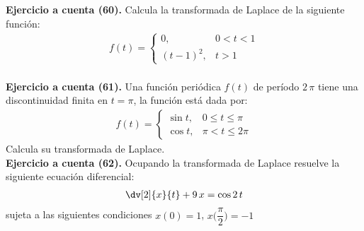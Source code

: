 \noindent
\textbf{Ejercicio a cuenta (60). } Calcula la transformada de Laplace de la siguiente función:
\begin{align*}
f(t) = \begin{cases}
0, & 0 < t < 1 \\
(t - 1)^{2}, & t > 1
\end{cases}
\end{align*}
\\[0.5em]
\noindent
\textbf{Ejercicio a cuenta (61). } Una función periódica $f(t)$ de período $2 \, \pi$ tiene una discontinuidad finita en $t = \pi$, la función está dada por:
\begin{align*}
f(t) = \begin{cases}
\sin t, & 0 \leq t \leq \pi \\
\cos t, & \pi < t \leq 2 \pi
\end{cases}
\end{align*}
Calcula su transformada de Laplace.
\\[0.5em]
\noindent
\textbf{Ejercicio a cuenta (62). } Ocupando la transformada de Laplace resuelve la siguiente ecuación diferencial:
\begin{align*}
\dv[2]{x}{t} + 9 \, x = \cos 2 \, t
\end{align*}
sujeta a las siguientes condiciones $x (0) =  1$, $x \bigg( \dfrac{\pi}{2} \bigg) = -1$
